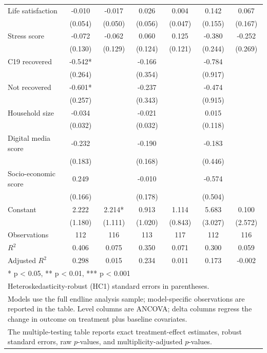 \begin{table}
\begin{tabular}[t]{lcccccc}
Life satisfaction & -0.010 & -0.017 & 0.026 & 0.004 & 0.142 & 0.067\\
 & (0.054) & (0.050) & (0.056) & (0.047) & (0.155) & (0.167)\\
Stress score & -0.072 & -0.062 & 0.060 & 0.125 & -0.380 & -0.252\\
 & (0.130) & (0.129) & (0.124) & (0.121) & (0.244) & (0.269)\\
C19 recovered & -0.542* &  & -0.166 &  & -0.784 & \\
 & (0.264) &  & (0.354) &  & (0.917) & \\
Not recovered & -0.601* &  & -0.237 &  & -0.474 & \\
 & (0.257) &  & (0.343) &  & (0.915) & \\
Household size & -0.034 &  & -0.021 &  & 0.015 & \\
 & (0.032) &  & (0.032) &  & (0.118) & \\
Digital media score & -0.232 &  & -0.190 &  & -0.183 & \\
 & (0.183) &  & (0.168) &  & (0.446) & \\
Socio-economic score & 0.249 &  & -0.010 &  & -0.574 & \\
 & (0.166) &  & (0.178) &  & (0.504) & \\
Constant & 2.222 & 2.214* & 0.913 & 1.114 & 5.683 & 0.100\\
 & (1.180) & (1.111) & (1.020) & (0.843) & (3.027) & (2.572)\\
Observations & 112 & 116 & 113 & 117 & 112 & 116\\
$R^{2}$ & 0.406 & 0.075 & 0.350 & 0.071 & 0.300 & 0.059\\
Adjusted $R^{2}$ & 0.298 & 0.015 & 0.234 & 0.011 & 0.173 & -0.002\\
\bottomrule
\multicolumn{7}{l}{\rule{0pt}{1em}* p < 0.05, ** p < 0.01, *** p < 0.001}\\
\multicolumn{7}{l}{\rule{0pt}{1em}Heteroskedasticity-robust (HC1) standard errors in parentheses.}\\
\multicolumn{7}{l}{\rule{0pt}{1em}Models use the full endline analysis sample; model-specific observations are reported in the table. Level columns are ANCOVA; delta columns regress the change in outcome on treatment plus baseline covariates.}\\
\multicolumn{7}{l}{\rule{0pt}{1em}The multiple-testing table reports exact treatment-effect estimates, robust standard errors, raw $p$-values, and multiplicity-adjusted $p$-values.}\\
\end{tabular}
\end{table}
